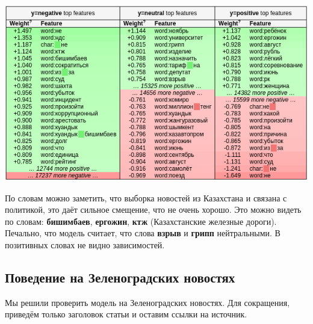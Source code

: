 \documentclass[12pt]{article}
\begin{document}
            \begin{center}
                \includegraphics[scale=0.8]{logreg_eli5}
            \end{center}

            По словам можно заметить, что выборка новостей из Казахстана и связана с политикой, это даёт сильное смещение, что не очень хорошо. 
            Это можно видеть по словам: \textbf{бишимбаев}, \textbf{ергожин}, \textbf{ктж} (Казахстанские железные дороги).
            Печально, что модель считает, что слова \textbf{взрыв} и \textbf{грипп} нейтральными. 
            В позитивных словах не видно зависимостей.
        
        \subsection{Поведение на Зеленоградских новостях}
            Мы решили проверить модель на Зеленоградских новостях.
            Для сокращения, приведём только заголовок статьи и оставим ссылки на источник.
\end{document}
